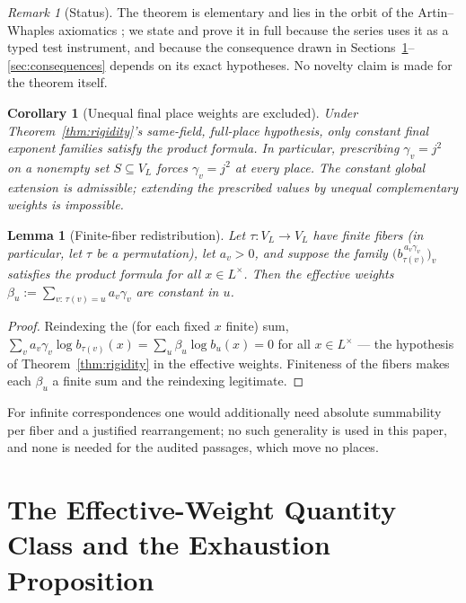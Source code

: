 \documentclass[11pt,a4paper]{article}
\newtheorem{lemma}[theorem]{Lemma}
\newtheorem{corollary}[theorem]{Corollary}
\theoremstyle{definition}
\theoremstyle{remark}
\newtheorem{remark}[theorem]{Remark}
\begin{document}
\begin{remark}[Status]\label{rem:status}
The theorem is elementary and lies in the orbit of the Artin--Whaples
axiomatics \cite{artinwhaples}; we state and prove it in full because the
series uses it as a typed test instrument, and because the consequence drawn
in Sections~\ref{sec:application}--\ref{sec:consequences} depends on its
exact hypotheses. No novelty claim is made for the theorem itself.
\end{remark}

\begin{corollary}[Unequal final place weights are excluded]\label{cor:noselect}
Under Theorem~\ref{thm:rigidity}'s same-field, full-place hypothesis,
only constant final exponent families satisfy the product formula.
In particular, prescribing $\gamma_v=j^2$ on a nonempty set
$S\subseteq V_L$ forces $\gamma_v=j^2$ at every place.
The constant global extension is admissible; extending the prescribed
values by unequal complementary weights is impossible.
\end{corollary}

\begin{lemma}[Finite-fiber redistribution]\label{lem:redistribution}
Let $\tau : V_L \to V_L$ have finite fibers (in particular, let $\tau$ be a
permutation), let $a_v > 0$, and suppose the family
$\bigl(b_{\tau(v)}^{\,a_v \gamma_v}\bigr)_{v}$ satisfies the product formula
for all $x \in L^\times$. Then the effective weights
$\beta_u := \sum_{v :\, \tau(v) = u} a_v \gamma_v$ are constant in $u$.
\end{lemma}

\begin{proof}
Reindexing the (for each fixed $x$ finite) sum,
$\sum_v a_v\gamma_v \log b_{\tau(v)}(x) = \sum_u \beta_u \log b_u(x) = 0$ for
all $x \in L^\times$ --- the hypothesis of Theorem~\ref{thm:rigidity} in the
effective weights. Finiteness of the fibers makes each $\beta_u$ a finite sum
and the reindexing legitimate.
\end{proof}

For infinite correspondences one would additionally need absolute
summability per fiber and a justified rearrangement; no such generality is
used in this paper, and none is needed for the audited passages, which move
no places.

\section{The Effective-Weight Quantity Class and the Exhaustion
Proposition}\label{sec:application}
\end{document}
